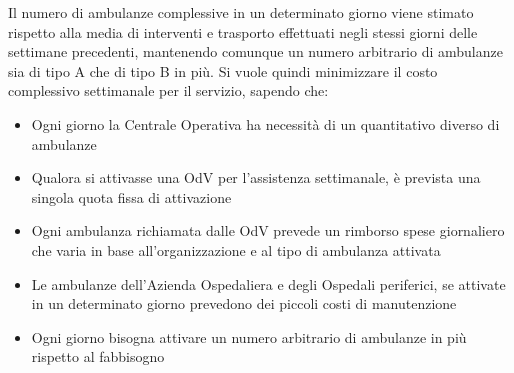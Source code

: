 Il numero di ambulanze complessive in un determinato giorno viene stimato rispetto alla media di interventi e trasporto effettuati negli stessi giorni delle settimane precedenti, mantenendo comunque un numero arbitrario di ambulanze sia di tipo A che di tipo B in più.
\newline \newline
Si vuole quindi minimizzare il costo complessivo settimanale per il servizio, sapendo che:
\begin{itemize}
    \item Ogni giorno la Centrale Operativa ha necessità di un quantitativo diverso di ambulanze
    \item Qualora si attivasse una OdV per l'assistenza settimanale, è prevista una singola quota fissa di attivazione
    \item Ogni ambulanza richiamata dalle OdV prevede un rimborso spese giornaliero che varia in base all'organizzazione e al tipo di ambulanza attivata
    \item Le ambulanze dell'Azienda Ospedaliera e degli Ospedali periferici, se attivate in un determinato giorno prevedono dei piccoli costi di manutenzione
    \item Ogni giorno bisogna attivare un numero arbitrario di ambulanze in più rispetto al fabbisogno
\end{itemize}